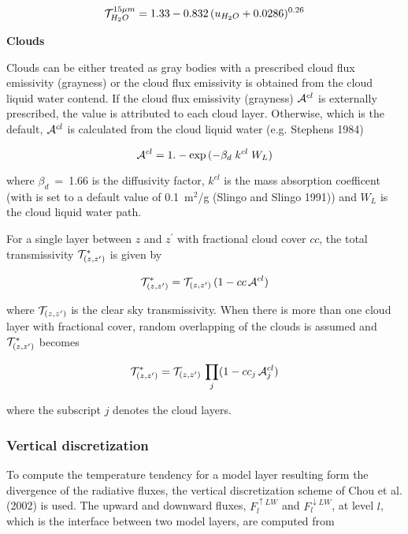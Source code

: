 \begin{equation}
{\cal T}_{H_2O}^{15\mu m}  =  1.33-0.832 \, (u_{H_2O}
+
0.0286)^{0.26} 
\end{equation}

{\bf  Clouds}

Clouds can be either treated as gray bodies with a prescribed cloud flux emissivity (grayness) or
the cloud flux emissivity is obtained from the cloud liquid water contend. If the cloud flux
emissivity (grayness) ${\cal A}^{cl}$  is externally prescribed, the value is 
attributed to each cloud layer. Otherwise, which is the default, ${\cal A}^{cl}$ is calculated
from the cloud liquid water (e.g. Stephens 1984)

\begin{equation}
{\cal A}^{cl}=1.-\exp{(-\beta_d \; k^{cl} \; W_L)}
\end{equation}
  
where $\beta_d$~=~1.66 is the diffusivity factor, $k^{cl}$ is the mass absorption coefficent
(with
is set to a default value of 0.1~m$^2$/g (Slingo and Slingo 1991)) and $W_L$ is the
cloud liquid water path.

For a single layer
between $z$ and $z^{\prime}$ with fractional cloud
cover
$cc$, the total transmissivity ${\cal T}^*_{(z, z^{\prime})}$
is
given by


\begin{equation}
{\cal T}^*_{(z, z^{\prime})} = {\cal T}_{(z, z^{\prime})} \, (1 -  cc \,
{\cal A}^{cl})
\end{equation}

where ${\cal T}_{(z, z^{\prime})}$ is the clear sky
transmissivity. When there is more than one cloud
layer
with fractional cover, random overlapping of the
clouds is
assumed and ${\cal T}^*_{(z, z^{\prime})}$ becomes

\begin{equation}
{\cal T}^*_{(z, z^{\prime})} ={\cal T}_{(z, z^{\prime})} \, \prod_j (1
- cc_j \, {\cal A}^{cl}_{j}) 
\end{equation}

where the subscript $j$ denotes the cloud layers.

\subsubsection*{Vertical discretization}

To compute the temperature tendency for a model
layer  resulting form the divergence of the radiative
fluxes, the vertical discretization scheme of Chou et al. (2002) is used. The upward and
downward fluxes, $F_l^{\uparrow LW}$ and $F_l^{\downarrow LW}$, at
level $l$, which is the interface between two model
layers, are computed from 


